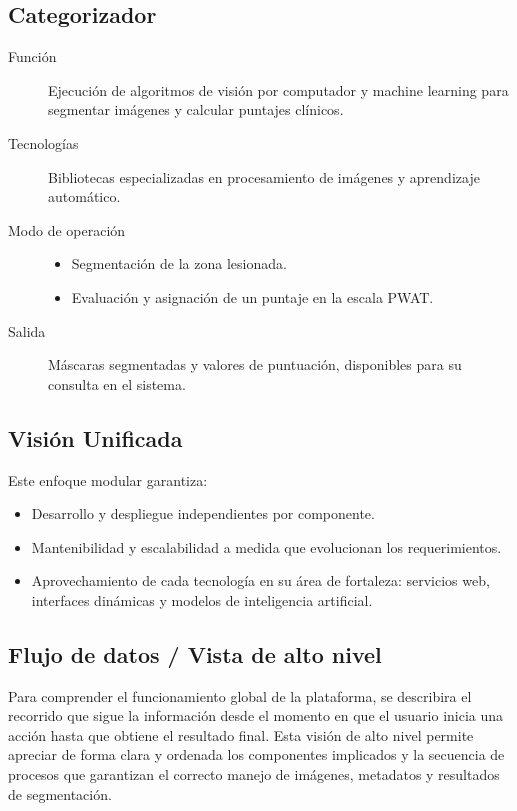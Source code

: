 \subsection{Categorizador}
\begin{description}
\item[Función] Ejecución de algoritmos de visión por computador y machine learning para segmentar imágenes y calcular puntajes clínicos.
\item[Tecnologías] Bibliotecas especializadas en procesamiento de imágenes y aprendizaje automático.
\item[Modo de operación]
\begin{itemize}
\item Segmentación de la zona lesionada.
\item Evaluación y asignación de un puntaje en la escala PWAT.
\end{itemize}
\item[Salida] Máscaras segmentadas y valores de puntuación, disponibles para su consulta en el sistema.
\end{description}

\subsection{Visión Unificada}
Este enfoque modular garantiza:
\begin{itemize}
\item Desarrollo y despliegue independientes por componente.
\item Mantenibilidad y escalabilidad a medida que evolucionan los requerimientos.
\item Aprovechamiento de cada tecnología en su área de fortaleza: servicios web, interfaces dinámicas y modelos de inteligencia artificial.
\end{itemize}



\subsection{Flujo de datos / Vista de alto nivel}
\label{ssc:flow}

Para comprender el funcionamiento global de la plataforma, se describira el recorrido que sigue la información desde el momento en que el usuario inicia una acción hasta que obtiene el resultado final. Esta visión de alto nivel permite apreciar de forma clara y ordenada los componentes implicados y la secuencia de procesos que garantizan el correcto manejo de imágenes, metadatos y resultados de segmentación.

